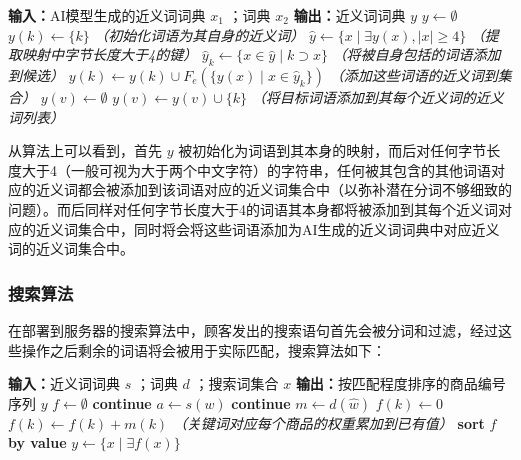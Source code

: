 \vspace{1em}
\begin{algorithmic}[1]
	\STATE \textbf{输入：}AI模型生成的近义词词典 $x_1$ ；词典 $x_2$
	\STATE \textbf{输出：}近义词词典 $y$
	\STATE $y \gets \emptyset$
		\STATE $y(k) \gets \{k\}$ \textit{（初始化词语为其自身的近义词）}
	\ENDFOR
	\STATE $\hat{y} \gets \{x \mid \exists y(x), \lvert x \rvert \geq 4 \}$ \textit{（提取映射中字节长度大于4的键）}
		\STATE $\hat{y}_k \gets \{x \in \hat{y} \mid k \supset x \}$ \textit{（将被自身包括的词语添加到候选）}
		\STATE $y(k) \gets y(k) \cup F_e(\{y(x) \mid x \in \hat{y}_k\})$ \textit{（添加这些词语的近义词到集合）}
	\ENDFOR
				\STATE $y(v) \gets \emptyset$
			\ENDIF
			\STATE $y(v) \gets y(v) \cup \{k\}$ \textit{（将目标词语添加到其每个近义词的近义词列表）}
		\ENDFOR
	\ENDFOR
\end{algorithmic}
\vspace{1em}

从算法上可以看到，首先 $y$ 被初始化为词语到其本身的映射，而后对任何字节长度大于4（一般可视为大于两个中文字符）的字符串，任何被其包含的其他词语对应的近义词都会被添加到该词语对应的近义词集合中（以弥补潜在分词不够细致的问题）。而后同样对任何字节长度大于4的词语其本身都将被添加到其每个近义词对应的近义词集合中，同时将会将这些词语添加为AI生成的近义词词典中对应近义词的近义词集合中。

\subsubsection{搜索算法}

在部署到服务器的搜索算法中，顾客发出的搜索语句首先会被分词和过滤，经过这些操作之后剩余的词语将会被用于实际匹配，搜索算法如下：

\vspace{1em}
\begin{algorithmic}[1]
	\STATE \textbf{输入：}近义词词典 $s$ ；词典 $d$ ；搜索词集合 $x$
	\STATE \textbf{输出：}按匹配程度排序的商品编号序列 $y$
	\STATE $f \gets \emptyset$
			\STATE \textbf{continue}
		\ENDIF
		\STATE $a \gets s(w)$
				\STATE \textbf{continue}
			\ENDIF
			\STATE $m \gets d(\hat{w})$
					\STATE $f(k) \gets 0$
				\ENDIF
				\STATE $f(k) \gets f(k) + m(k)$ \textit{（关键词对应每个商品的权重累加到已有值）}
			\ENDFOR
		\ENDFOR
	\ENDFOR
	\STATE \textbf{sort} $f$ \textbf{by value} 
	\STATE $y \gets \{x \mid \exists f(x)\}$
\end{algorithmic}
\vspace{1em}

